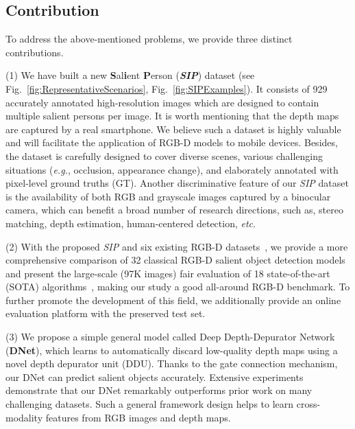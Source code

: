 \documentclass[journal]{IEEEtran}
\def\eg{\emph{e.g.}}
\def\etc{\emph{etc}}
\newcommand{\figref}[1]{Fig.~\ref{#1}}
\newcommand{\fdp}[1]{#1}
\begin{document}
\subsection{Contribution}
To \fdp{address} the \fdp{above-mentioned} problem\fdp{s},
we \fdp{provide} three distinct contributions.

(1) We \fdp{have} built a new \textbf{S}al\textbf{i}ent \textbf{P}erson
(\emph{\textbf{SIP}}) dataset (see \figref{fig:RepresentativeScenarios}, \figref{fig:SIPExamples}).
It consists of 929 accurately annotated high-resolution images which
are designed to contain multiple salient persons per image.
It \fdp{is} worth mentioning that the depth maps are captured by \fdp{a}
real \fdp{smartphone}. We believe such a dataset is highly \fdp{valuable}
and \fdp{will facilitate the application of} RGB-D model\fdp{s} to \fdp{mobile devices.}
Besides, the dataset is carefully \fdp{designed} to cover diverse scenes,
various challenging situations (\eg, occlusion, appearance change),
and elaborately annotated with pixel-level ground truth\fdp{s} (GT).
Another discriminative feature of our \emph{SIP} dataset is the
availability of both RGB and \fdp{grayscale} images captured by \fdp{a}
binocular camera, \fdp{which can benefit a broad number of} research directions,
\fdp{such as}, stereo matching, depth \fdp{estimation,} human-centered detection, \etc.

(2) With the proposed \emph{SIP} and \fdp{six existing} RGB-D
datasets~\cite{ju2014depth,niu2012leveraging,cheng2014depth,peng2014rgbd,zhu2017three,li2014saliency},
we provide a more comprehensive \fdp{comparison} of 32 classical RGB-D salient
object detection models and present the \fdp{large-scale} (97K images)
fair evaluation of 18 state-of-the-art (\fdp{SOTA}) algorithms~\cite{peng2014rgbd,cheng2014depth,ju2014depth,
ren2015exploiting,feng2016local,cong2016saliency,guo2016salient,zhu2017innovative,
qu2017rgbd,song2017depth,cong2017iterative,cong2018hscs,cong2018co,liang2018stereoscopic,
chen2018progressively,han2017cnns}, making \fdp{our study} a good all-around RGB-D benchmark.
To further promote the development of this field, we additionally provide an
online evaluation platform with the preserved test set.


(3) \fdp{We} propose a simple general model called
Deep Depth-Depurator Network (\textbf{DNet}), which
learns to automatically discard low-quality
depth map\fdp{s} using a novel depth depurator unit (DDU).
Thanks to the gate connection mechanism, our DNet
can predict salient object\fdp{s} accurately.
Extensive experiments \fdp{demonstrate} that our DNet
remarkably outperforms prior work on many \fdp{challenging} datasets.
Such a general framework design helps to learn cross-modality
features from RGB image\fdp{s} and depth map\fdp{s}.
\end{document}
